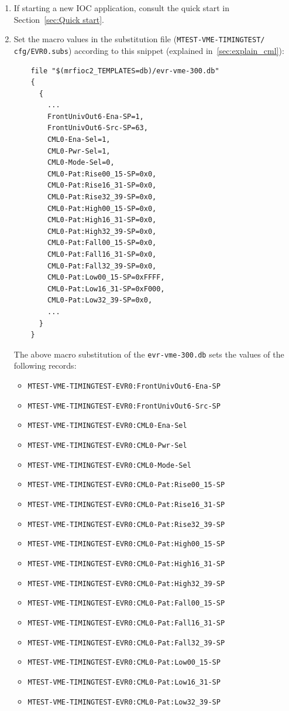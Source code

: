 \documentclass[12pt,a4paper]{article}
\begin{document}
\begin{enumerate}
	\item If starting a new IOC application, consult the quick start in Section~\ref{sec:Quick start}.
	
	\item Set the macro values in the substitution file (\texttt{MTEST-VME-TIMINGTEST/} \texttt{cfg/EVR0.subs}) according to this snippet (explained in~\ref{sec:explain_cml}):
\begin{verbatim}
	file "$(mrfioc2_TEMPLATES=db)/evr-vme-300.db"
	{
	  {
	    ...
	    FrontUnivOut6-Ena-SP=1,
	    FrontUnivOut6-Src-SP=63,
	    CML0-Ena-Sel=1,
	    CML0-Pwr-Sel=1,
	    CML0-Mode-Sel=0,
	    CML0-Pat:Rise00_15-SP=0x0,
	    CML0-Pat:Rise16_31-SP=0x0,
	    CML0-Pat:Rise32_39-SP=0x0,
	    CML0-Pat:High00_15-SP=0x0,
	    CML0-Pat:High16_31-SP=0x0,
	    CML0-Pat:High32_39-SP=0x0,
	    CML0-Pat:Fall00_15-SP=0x0,
	    CML0-Pat:Fall16_31-SP=0x0,
	    CML0-Pat:Fall32_39-SP=0x0,
	    CML0-Pat:Low00_15-SP=0xFFFF,
	    CML0-Pat:Low16_31-SP=0xF000,
	    CML0-Pat:Low32_39-SP=0x0,
	    ...
	  }
	}
\end{verbatim}
	The above macro substitution of the \texttt{evr-vme-300.db} sets the values of the following records:
	\begin{itemize}
		\item \texttt{MTEST-VME-TIMINGTEST-EVR0:FrontUnivOut6-Ena-SP}
		\item \texttt{MTEST-VME-TIMINGTEST-EVR0:FrontUnivOut6-Src-SP}
		\item \texttt{MTEST-VME-TIMINGTEST-EVR0:CML0-Ena-Sel}
		\item \texttt{MTEST-VME-TIMINGTEST-EVR0:CML0-Pwr-Sel}
		\item \texttt{MTEST-VME-TIMINGTEST-EVR0:CML0-Mode-Sel}
		\item \texttt{MTEST-VME-TIMINGTEST-EVR0:CML0-Pat:Rise00\_15-SP}
		\item \texttt{MTEST-VME-TIMINGTEST-EVR0:CML0-Pat:Rise16\_31-SP}
		\item \texttt{MTEST-VME-TIMINGTEST-EVR0:CML0-Pat:Rise32\_39-SP}
		\item \texttt{MTEST-VME-TIMINGTEST-EVR0:CML0-Pat:High00\_15-SP}
		\item \texttt{MTEST-VME-TIMINGTEST-EVR0:CML0-Pat:High16\_31-SP}
		\item \texttt{MTEST-VME-TIMINGTEST-EVR0:CML0-Pat:High32\_39-SP}
		\item \texttt{MTEST-VME-TIMINGTEST-EVR0:CML0-Pat:Fall00\_15-SP}
		\item \texttt{MTEST-VME-TIMINGTEST-EVR0:CML0-Pat:Fall16\_31-SP}
		\item \texttt{MTEST-VME-TIMINGTEST-EVR0:CML0-Pat:Fall32\_39-SP}
		\item \texttt{MTEST-VME-TIMINGTEST-EVR0:CML0-Pat:Low00\_15-SP}
		\item \texttt{MTEST-VME-TIMINGTEST-EVR0:CML0-Pat:Low16\_31-SP}
		\item \texttt{MTEST-VME-TIMINGTEST-EVR0:CML0-Pat:Low32\_39-SP}
	\end{itemize}


\end{enumerate}
\end{document}
